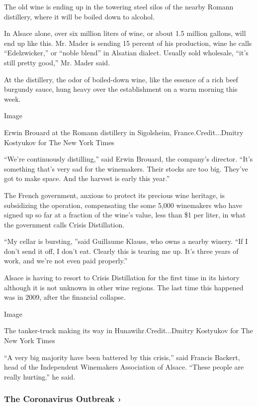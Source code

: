 The old wine is ending up in the towering steel silos of the nearby
Romann distillery, where it will be boiled down to alcohol.

In Alsace alone, over six million liters of wine, or about 1.5 million
gallons, will end up like this. Mr. Mader is sending 15 percent of his
production, wine he calls ``Edelzwicker,'' or ``noble blend'' in
Alsatian dialect. Usually sold wholesale, ``it's still pretty good,''
Mr. Mader said.

At the distillery, the odor of boiled-down wine, like the essence of a
rich beef burgundy sauce, hung heavy over the establishment on a warm
morning this week.

Image

Erwin Brouard at the Romann distillery in Sigolsheim,
France.Credit...Dmitry Kostyukov for The New York Times

``We're continuously distilling,'' said Erwin Brouard, the company's
director. ``It's something that's very sad for the winemakers. Their
stocks are too big. They've got to make space. And the harvest is early
this year.''

The French government, anxious to protect its precious wine heritage, is
subsidizing the operation, compensating the some 5,000 winemakers who
have signed up so far at a fraction of the wine's value, less than \$1
per liter, in what the government calls Crisis Distillation.

``My cellar is bursting, ''said Guillaume Klauss, who owns a nearby
winery. ``If I don't send it off, I don't eat. Clearly this is tearing
me up. It's three years of work, and we're not even paid properly.''

Alsace is having to resort to Crisis Distillation for the first time in
its history although it is not unknown in other wine regions. The last
time this happened was in 2009, after the financial collapse.

Image

The tanker-truck making its way in Hunawihr.Credit...Dmitry Kostyukov
for The New York Times

``A very big majority have been battered by this crisis,'' said Francis
Backert, head of the Independent Winemakers Association of Alsace.
``These people are really hurting.'' he said.

\href{https://www.nytimes.com/news-event/coronavirus?action=click\&pgtype=Article\&state=default\&region=MAIN_CONTENT_3\&context=storylines_faq}{}

\hypertarget{the-coronavirus-outbreak-}{%
\subsubsection{The Coronavirus Outbreak
›}\label{the-coronavirus-outbreak-}}

